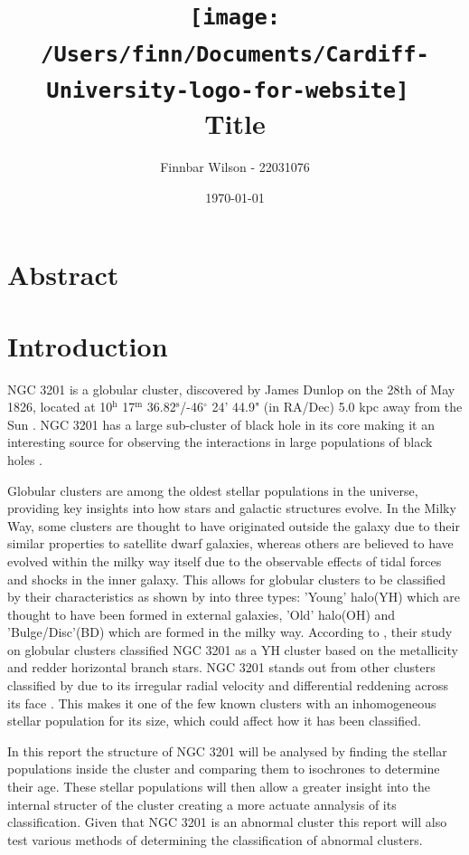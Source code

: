 \documentclass[11pt]{article}
\title{\vspace{-2cm}
\texttt{[image: /Users/finn/Documents/Cardiff-University-logo-for-website]}~\\[1cm]
Title
}
\author{Finnbar Wilson - 22031076}
\date{\today}
\begin{document}
\maketitle

\section*{Abstract}

\pagebreak
\section{Introduction}

NGC 3201 is a globular cluster, discovered by James Dunlop on the 28th of May 1826, located at 10$^{\text{h}}$ 17$^{\text{m}}$ 36.82$^{\text{s}}$/-46$^{\circ}$ 24' 44.9" (in RA/Dec) 5.0 kpc away from the Sun \citep{3201fact}. NGC 3201 has a large sub-cluster of black hole in its core making it an interesting source for observing the interactions in large populations of black holes \citep{blackholes}.

Globular clusters are among the oldest stellar populations in the universe, providing key insights into how stars and galactic structures evolve. In the Milky Way, some clusters are thought to have originated outside the galaxy due to their similar properties to satellite dwarf galaxies, whereas others are believed to have evolved within the milky way itself due to the observable effects of tidal forces and shocks in the inner galaxy. This allows for globular clusters to be classified by their characteristics as shown by \citet{Mackey} into three types: 'Young' halo(YH) which are thought to have been formed in external galaxies, 'Old' halo(OH) and 'Bulge/Disc'(BD) which are formed in the milky way. According to \citet{Mackey}, their study on globular clusters classified NGC 3201 as a YH cluster based on the metallicity and redder horizontal branch stars. NGC 3201 stands out from other clusters classified by \citet{Mackey} due to its irregular radial velocity and differential reddening across its face \citep{Kravtsov}. This makes it one of the few known clusters with an inhomogeneous stellar population for its size, which could affect how it has been classified.

In this report the structure of NGC 3201 will be analysed by finding the stellar populations inside the cluster and comparing them to isochrones to determine their age. These stellar populations will then allow a greater insight into the internal structer of the cluster creating a more actuate annalysis of its classification. Given that NGC 3201 is an abnormal cluster this report will also test various methods of determining the classification of abnormal clusters.
\end{document}
